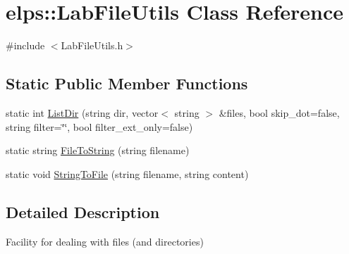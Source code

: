 \hypertarget{classelps_1_1_lab_file_utils}{\section{elps\-:\-:Lab\-File\-Utils Class Reference}
\label{classelps_1_1_lab_file_utils}
}


{\ttfamily \#include $<$Lab\-File\-Utils.\-h$>$}

\subsection*{Static Public Member Functions}
\begin{DoxyCompactItemize}
\item 
static int \hyperlink{classelps_1_1_lab_file_utils_aacfd6e526af7dc3622ffa8c1fd4073b1}{List\-Dir} (string dir, vector$<$ string $>$ \&files, bool skip\-\_\-dot=false, string filter=\char`\"{}\char`\"{}, bool filter\-\_\-ext\-\_\-only=false)
\item 
static string \hyperlink{classelps_1_1_lab_file_utils_a2ab6dd5307c6e6552e176a936d98d443}{File\-To\-String} (string filename)
\item 
static void \hyperlink{classelps_1_1_lab_file_utils_a5cd318782c1d5c32668b34d9034b0fde}{String\-To\-File} (string filename, string content)
\end{DoxyCompactItemize}


\subsection{Detailed Description}
Facility for dealing with files (and directories) 

